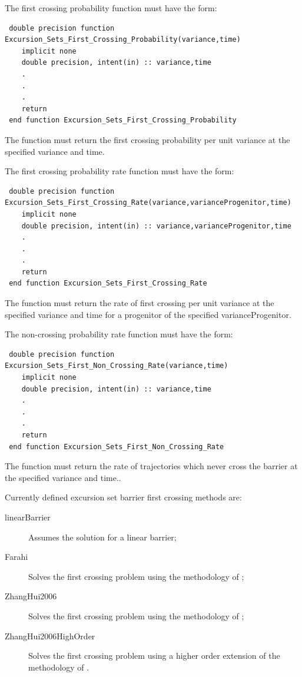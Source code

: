 The first crossing probability function must have the form:
\begin{verbatim}
 double precision function Excursion_Sets_First_Crossing_Probability(variance,time)
    implicit none
    double precision, intent(in) :: variance,time
    .
    .
    .
    return
 end function Excursion_Sets_First_Crossing_Probability
\end{verbatim}
The function must return the first crossing probability per unit variance at the specified {\normalfont \ttfamily variance} and {\normalfont \ttfamily time}.

The first crossing probability rate function must have the form:
\begin{verbatim}
 double precision function Excursion_Sets_First_Crossing_Rate(variance,varianceProgenitor,time)
    implicit none
    double precision, intent(in) :: variance,varianceProgenitor,time
    .
    .
    .
    return
 end function Excursion_Sets_First_Crossing_Rate
\end{verbatim}
The function must return the rate of first crossing per unit variance at the specified {\normalfont \ttfamily variance} and {\normalfont \ttfamily time} for a progenitor of the specified {\normalfont \ttfamily varianceProgenitor}.

The non-crossing probability rate function must have the form:
\begin{verbatim}
 double precision function Excursion_Sets_First_Non_Crossing_Rate(variance,time)
    implicit none
    double precision, intent(in) :: variance,time
    .
    .
    .
    return
 end function Excursion_Sets_First_Non_Crossing_Rate
\end{verbatim}
The function must return the rate of trajectories which never cross the barrier at the specified {\normalfont \ttfamily variance} and {\normalfont \ttfamily time}..

Currently defined excursion set barrier first crossing methods are:
\begin{description}
 \item [{\normalfont \ttfamily linearBarrier}] Assumes the solution for a linear barrier;
 \item [{\normalfont \ttfamily Farahi}] Solves the first crossing problem using the methodology of \cite{benson_dark_2012};
 \item [{\normalfont \ttfamily ZhangHui2006}] Solves the first crossing problem using the methodology of \cite{zhang_random_2006};
 \item [{\normalfont \ttfamily ZhangHui2006HighOrder}] Solves the first crossing problem using a higher order extension of the methodology of \cite{zhang_random_2006}.
\end{description}

